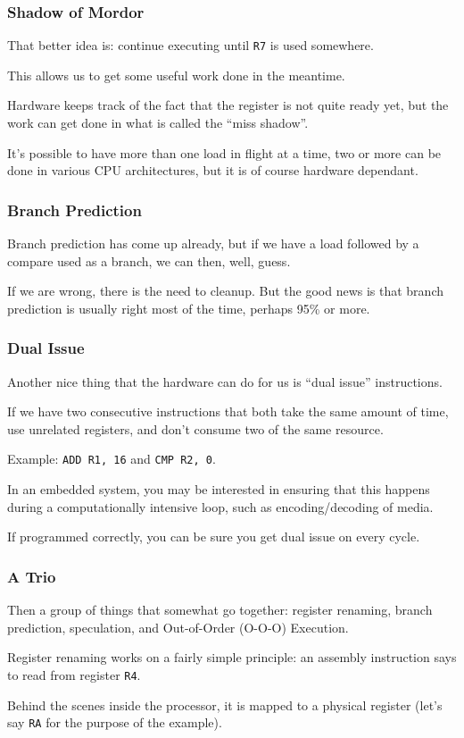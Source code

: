 \begin{frame}
\frametitle{Shadow of Mordor}

That better idea is: continue executing until \texttt{R7} is used somewhere. 

This allows us to get some useful work done in the meantime. 

Hardware keeps track of the fact that the register is not quite ready yet, but the work can get done in what is called the ``miss shadow''. 

It's possible to have more than one load in flight at a time, two or more can be done in various CPU architectures, but it is of course hardware dependant. 

\end{frame}



\begin{frame}
\frametitle{Branch Prediction}

Branch prediction has come up already, but if we have a load followed by a compare used as a branch, we can then, well, guess. 

If we are wrong, there is the need to cleanup. But the good news is that branch prediction is usually right most of the time, perhaps 95\% or more.

\end{frame}



\begin{frame}
\frametitle{Dual Issue}

Another nice thing that the hardware can do for us is ``dual issue'' instructions. 

If we have two consecutive instructions that both take the same amount of time, use unrelated registers, and don't consume two of the same resource.

Example: \texttt{ADD R1, 16} and \texttt{CMP R2, 0}. 

In an embedded system, you may be interested in ensuring that this happens during a computationally intensive loop, such as encoding/decoding of media. 

If programmed correctly, you can be sure you get dual issue on every cycle.


\end{frame}




\begin{frame}
\frametitle{A Trio}

Then a group of things that somewhat go together: register renaming, branch prediction, speculation, and Out-of-Order (O-O-O) Execution. 

Register renaming works on a fairly simple principle: an assembly instruction says to read from register \texttt{R4}. 

Behind the scenes inside the processor, it is mapped to a physical register (let's say \texttt{RA} for the purpose of the example).


\end{frame}



